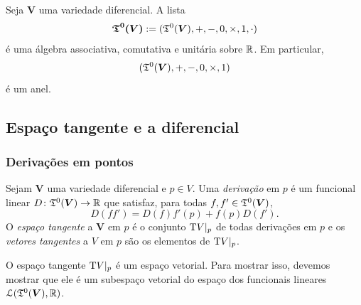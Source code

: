 \begin{proposition}
Seja $\bm V$ uma variedade diferencial. A lista
	\begin{equation*}
	\bm{\mathfrak{T}^0(\bm V)} := (\mathfrak{T}^0(\bm V),+,-,0,\times,1,\cdot)
	\end{equation*}
é uma álgebra associativa, comutativa e unitária sobre $\mathbb{R}$. Em particular,
	\begin{equation*}
	(\mathfrak{T}^0(\bm V),+,-,0,\times,1)
	\end{equation*}
é um anel.
\end{proposition}

\subsection{Espaço tangente e a diferencial}

\subsubsection{Derivações em pontos}

\begin{definition}
Sejam $\bm V$ uma variedade diferencial e $p \in V$. Uma \emph{derivação} em $p$ é um funcional linear $D\colon \mathfrak{T}^0(\bm V) \to \mathbb{R}$ que satisfaz, para todas $f,f' \in \mathfrak{T}^0(\bm V)$,
	\begin{equation*}
	D(ff') = D(f)f'(p) + f(p)D(f').
	\end{equation*}
O \emph{espaço tangente} a $\bm V$ em $p$ é o conjunto $\mathrm{T} V|_p$ de todas derivações em $p$ e os \emph{vetores tangentes} a $V$ em $p$ são os elementos de $\mathrm{T} V|_p$.
\end{definition}

O espaço tangente $\mathrm{T} V|_p$ é um espaço vetorial. Para mostrar isso, devemos mostrar que ele é um subespaço vetorial do espaço dos funcionais lineares $\mathcal{L}(\mathfrak{T}^0(\bm V),\mathbb{R})$.

